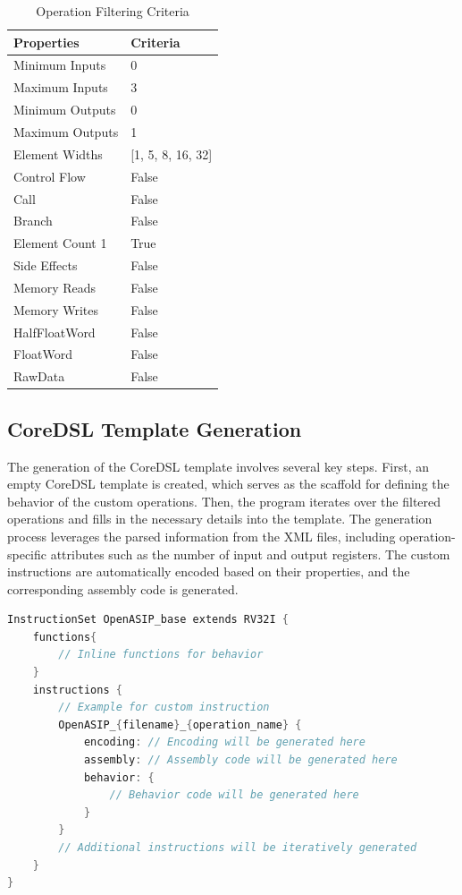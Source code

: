 \begin{table}[hb]
    \centering
    \caption{Operation Filtering Criteria}
    \label{tab:filtercriteria}
    \begin{tabular}{@{}ll@{}}
    \toprule
    \textbf{Properties} & \textbf{Criteria} \\ \midrule
    Minimum Inputs & 0 \\
    Maximum Inputs & 3 \\
    Minimum Outputs & 0 \\
    Maximum Outputs & 1 \\
    Element Widths & [1, 5, 8, 16, 32] \\
    Control Flow & False \\
    Call & False \\
    Branch & False \\
    Element Count 1 & True \\
    Side Effects & False \\
    Memory Reads & False \\
    Memory Writes & False \\
    HalfFloatWord & False \\
    FloatWord & False \\
    RawData & False \\ \bottomrule
    \end{tabular}
\end{table}

\subsection{CoreDSL Template Generation}

The generation of the CoreDSL template involves several key steps. First, an empty CoreDSL template is created, which serves as the scaffold for defining the behavior of the custom operations. Then, the program iterates over the filtered operations and fills in the necessary details into the template. The generation process leverages the parsed information from the XML files, including operation-specific attributes such as the number of input and output registers. The custom instructions are automatically encoded based on their properties, and the corresponding assembly code is generated.

\begin{lstlisting}[caption={CoreDSL Template},captionpos=b,language=C]
InstructionSet OpenASIP_base extends RV32I {
    functions{
        // Inline functions for behavior
    }
    instructions {
        // Example for custom instruction
        OpenASIP_{filename}_{operation_name} {
            encoding: // Encoding will be generated here
            assembly: // Assembly code will be generated here
            behavior: {
                // Behavior code will be generated here
            }
        }
        // Additional instructions will be iteratively generated
    }
}   
\end{lstlisting}

